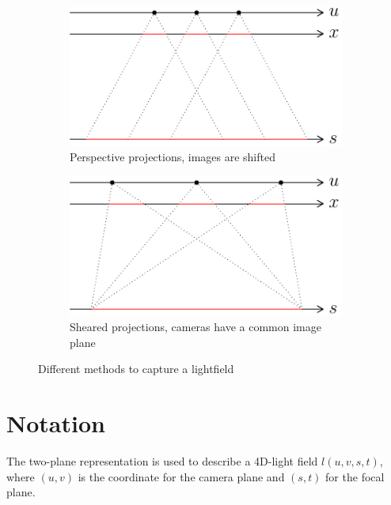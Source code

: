 \documentclass[11pt,a4paper,titlepage]{article}
\begin{document}
\begin{figure}
	\centering
	\begin{subfigure}[b]{0.4\textwidth}
 		\includegraphics[scale=1]{sketches/projection_type_shifted.pdf}
  		\caption{Perspective projections, images are shifted}
   		\label{fig:perspective_shifted_projections}
	\end{subfigure}%
	\qquad
	\begin{subfigure}[b]{0.4\textwidth}
		\includegraphics[scale=1]{sketches/projection_type_sheared.pdf}
		\caption{Sheared projections, cameras have a common image plane}
		\label{fig:sheared_projections}
	\end{subfigure}
	\caption{Different methods to capture a lightfield}
\end{figure}

\section{Notation}

The two-plane representation is used to describe a 4D-light field $l\left( u, v, s, t \right)$, where $\left( u, v \right)$ is the coordinate for the camera plane and $\left( s, t \right)$ for the focal plane. 
\end{document}
